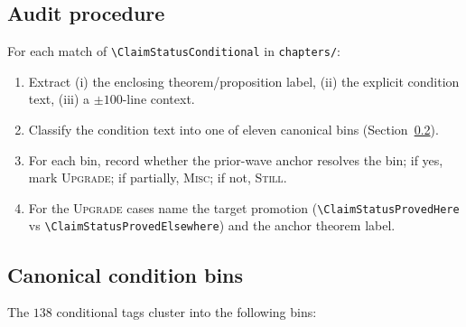 \documentclass[11pt]{amsart}
\begin{document}
\subsection{Audit procedure}
\label{subsec:procedure}

For each match of \texttt{\textbackslash ClaimStatusConditional} in
\texttt{chapters/}:
\begin{enumerate}[label=\textup{(\arabic*)}]
\item Extract (i) the enclosing theorem/proposition label, (ii) the
  explicit condition text, (iii) a $\pm 100$-line context.
\item Classify the condition text into one of eleven canonical bins
  (Section~\ref{subsec:condition-bins}).
\item For each bin, record whether the prior-wave anchor resolves the
  bin; if yes, mark \textsc{Upgrade}; if partially, \textsc{Misc}; if
  not, \textsc{Still}.
\item For the \textsc{Upgrade} cases name the target promotion
  (\texttt{\textbackslash ClaimStatusProvedHere} vs
  \texttt{\textbackslash ClaimStatusProvedElsewhere}) and the anchor
  theorem label.
\end{enumerate}

\subsection{Canonical condition bins}
\label{subsec:condition-bins}

The $138$ conditional tags cluster into the following bins:
\end{document}
